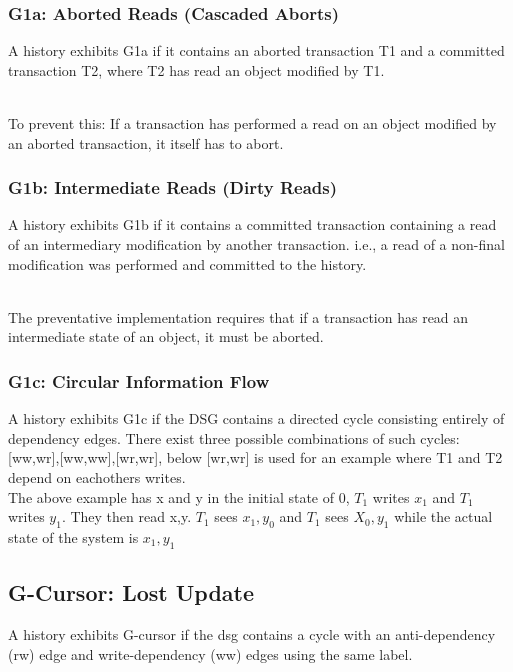 \documentclass[a4paper,10pt,titlepage]{report}
\begin{document}
\subsubsection{G1a: Aborted Reads (Cascaded Aborts)}

    A history exhibits G1a if it contains an aborted transaction T1 and a committed transaction T2, where T2 has read an object modified by T1. 
    
    \\

To prevent this: If a transaction has performed a read on an object modified by an aborted transaction, it itself has to abort.
\subsubsection{G1b: Intermediate Reads (Dirty Reads)}
    A history exhibits G1b if it contains a committed transaction containing a read of an intermediary modification by another transaction. i.e., a read of a non-final modification was performed and committed to the history. 

 \\
The preventative implementation requires that if a transaction has read an intermediate state of an object, it must be aborted.


\subsubsection{G1c: Circular Information Flow}
A history exhibits G1c if the DSG contains a directed cycle consisting entirely of dependency edges. There exist three possible combinations of such cycles: [ww,wr],[ww,ww],[wr,wr], below [wr,wr] is used for an example where T1 and T2 depend on eachothers writes.\\


The above example has x and y in the initial state of 0, $T_1$ writes $x_1$ and $T_1$ writes $y_1$. They then read x,y. $T_1$ sees $x_1,y_0$ and $T_1$ sees $X_0,y_1$ while the actual state of the system is $x_1,y_1$


\subsection{G-Cursor: Lost Update}
A history exhibits G-cursor if the dsg contains a cycle with an anti-dependency (rw) edge and write-dependency (ww) edges using the same label.\\

\end{document}
